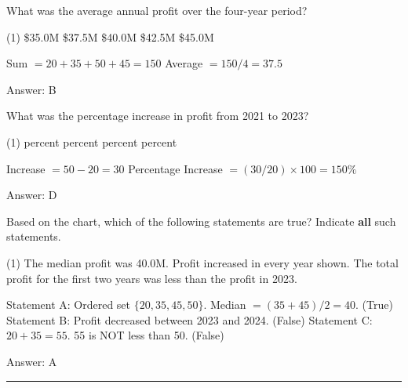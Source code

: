 \documentclass[11pt,paper=a4,answers]{exam}
\begin{document}
\begin{questions}
\question
What was the average annual profit over the four-year period?

\begin{tasks}(1)
\task[A)] \$35.0M \task[B)] \$37.5M \task[C)] \$40.0M \task[D)] \$42.5M \task[E)] \$45.0M
\end{tasks}

\begin{solution}
\begin{center}
Sum $= 20 + 35 + 50 + 45 = 150$
\vspace{5pt}
Average $= 150 / 4 = 37.5$
\end{center}

Answer: \colorbox{yellow!100}{B}
\end{solution}

\vspace{1cm}

\question
What was the percentage increase in profit from 2021 to 2023?

\begin{tasks}(1)
 percent  percent  percent  percent %
\end{tasks}

\begin{solution}
\begin{center}
Increase $= 50 - 20 = 30$
\vspace{5pt}
Percentage Increase $= (30 / 20) \times 100 = 150\%$
\end{center}

Answer: \colorbox{yellow!100}{D}
\end{solution}

\vspace{1cm}

\question
Based on the chart, which of the following statements are true?
Indicate \textbf{all} such statements.

\begin{tasks}(1)
\task[A)] The median profit was 40.0M.
\task[B)] Profit increased in every year shown.
\task[C)] The total profit for the first two years was less than the profit in 2023.
\end{tasks}

\begin{solution}
\begin{center}
Statement A: Ordered set $\{20, 35, 45, 50\}$. Median $= (35+45)/2 = 40$. (True)
\vspace{5pt}
Statement B: Profit decreased between 2023 and 2024. (False)
\vspace{5pt}
Statement C: $20 + 35 = 55$. 55 is NOT less than 50. (False)
\end{center}

Answer: \colorbox{yellow!100}{A}
\end{solution}


\end{questions}
\begin{center}
\rule{.5\textwidth}{1pt}
\end{center}
\end{document}
